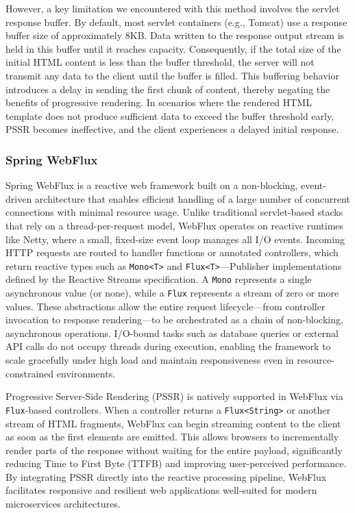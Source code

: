 However, a key limitation we encountered with this method involves the servlet
response buffer. By default, most servlet containers (e.g., Tomcat) use a
response buffer size of approximately 8KB. Data written to the response output
stream is held in this buffer until it reaches capacity. Consequently, if the
total size of the initial HTML content is less than the buffer threshold, the
server will not transmit any data to the client until the buffer is filled.
This buffering behavior introduces a delay in sending the first chunk of
content, thereby negating the benefits of progressive rendering. In scenarios
where the rendered HTML template does not produce sufficient data to exceed the
buffer threshold early, PSSR becomes ineffective, and the client experiences a
delayed initial response.

\subsubsection{Spring WebFlux}

Spring WebFlux is a reactive web framework built on a non-blocking,
event-driven architecture that enables efficient handling of a large number of
concurrent connections with minimal resource usage. Unlike traditional
servlet-based stacks that rely on a thread-per-request model, WebFlux operates
on reactive runtimes like Netty, where a small, fixed-size event loop manages
all I/O events. Incoming HTTP requests are routed to handler functions or
annotated controllers, which return reactive types such as \texttt{Mono<T>} and
\texttt{Flux<T>}—Publisher implementations defined by the Reactive Streams
specification. A \texttt{Mono} represents a single asynchronous value (or
none), while a \texttt{Flux} represents a stream of zero or more values. These
abstractions allow the entire request lifecycle—from controller invocation to
response rendering—to be orchestrated as a chain of non-blocking, asynchronous
operations. I/O-bound tasks such as database queries or external API calls do
not occupy threads during execution, enabling the framework to scale gracefully
under high load and maintain responsiveness even in resource-constrained
environments.

Progressive Server-Side Rendering (PSSR) is natively supported in WebFlux via
\texttt{Flux}-based controllers. When a controller returns a
\texttt{Flux<String>} or another stream of HTML fragments, WebFlux can begin
streaming content to the client as soon as the first elements are emitted. This
allows browsers to incrementally render parts of the response without waiting
for the entire payload, significantly reducing Time to First Byte (TTFB) and
improving user-perceived performance. By integrating PSSR directly into the
reactive processing pipeline, WebFlux facilitates responsive and resilient web
applications well-suited for modern microservices architectures.

